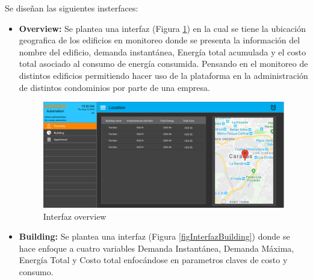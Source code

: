     Se diseñan las siguientes insterfaces:\\
    \begin{itemize}

        \item \textbf{Overview:} Se plantea una interfaz (Figura \ref{figInterfazOverview}) en la cual se tiene la ubicación geografica de los edificios
        en monitoreo donde se presenta la información del nombre del edificio, demanda instantánea, Energía total acumulada y el costo total asociado al 
        consumo de energía consumida. Pensando en el monitoreo de distintos edificios permitiendo hacer uso de la plataforma en la administración de
        distintos condominios por parte de una empresa.

        \begin{figure}[H]
            \centering
                \includegraphics[scale=0.2]
                {overview.pdf}
            \caption{Interfaz overview}
            \label{figInterfazOverview}
        \end{figure} 
        
        \item \textbf{Building:} Se plantea una interfaz (Figura \ref{figInterfazBuilding}) donde se hace enfoque a cuatro variables Demanda Instantánea, Demanda Máxima, Energía Total y 
        Costo total enfocándose en parametros claves de costo y consumo.
        

\end{itemize}
